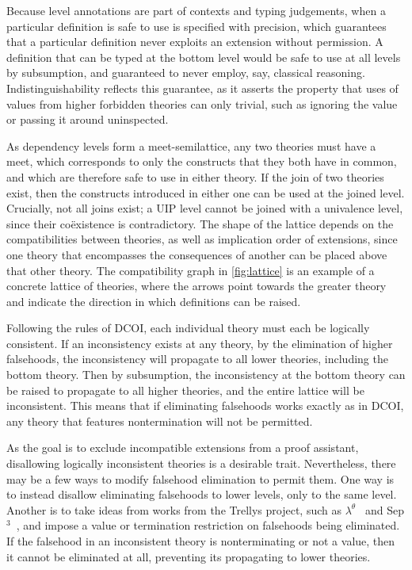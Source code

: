 \documentclass{article}
\begin{document}
Because level annotations are part of contexts and typing judgements,
when a particular definition is safe to use is specified with precision,
which guarantees that a particular definition never exploits an extension without permission.
A definition that can be typed at the bottom level
would be safe to use at all levels by subsumption,
and guaranteed to never employ, say, classical reasoning.
Indistinguishability reflects this guarantee, as it asserts the property that
uses of values from higher forbidden theories can only trivial,
such as ignoring the value or passing it around uninspected.

As dependency levels form a meet-semilattice,
any two theories must have a meet,
which corresponds to only the constructs that they both have in common,
and which are therefore safe to use in either theory.
If the join of two theories exist,
then the constructs introduced in either one can be used at the joined level.
Crucially, not all joins exist; a UIP level cannot be joined with a univalence level,
since their co\"existence is contradictory.
The shape of the lattice depends on the compatibilities between theories,
as well as implication order of extensions,
since one theory that encompasses the consequences of another
can be placed above that other theory.
The compatibility graph in \cref{fig:lattice}
is an example of a concrete lattice of theories,
where the arrows point towards the greater theory
and indicate the direction in which definitions can be raised.

Following the rules of DCOI,
each individual theory must each be logically consistent.
If an inconsistency exists at any theory,
by the elimination of higher falsehoods,
the inconsistency will propagate to all lower theories, including the bottom theory.
Then by subsumption, the inconsistency at the bottom theory
can be raised to propagate to all higher theories,
and the entire lattice will be inconsistent.
This means that if eliminating falsehoods works exactly as in DCOI,
any theory that features nontermination will not be permitted.

As the goal is to exclude incompatible extensions from a proof assistant,
disallowing logically inconsistent theories is a desirable trait.
Nevertheless, there may be a few ways to modify falsehood elimination to permit them.
One way is to instead disallow eliminating falsehoods to lower levels,
only to the same level.
Another is to take ideas from works from the Trellys project,
such as $\lambda^\theta$~\citep{lambda-theta} and Sep$^3$~\citep{sep3},
and impose a value or termination restriction on falsehoods being eliminated.
If the falsehood in an inconsistent theory is nonterminating or not a value,
then it cannot be eliminated at all,
preventing its propagating to lower theories.
\end{document}
